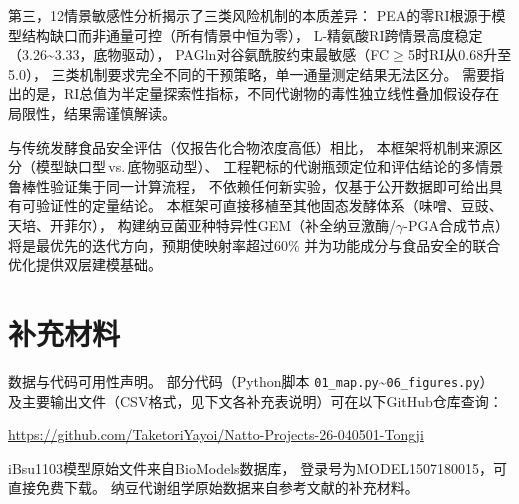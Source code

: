 \documentclass[10pt, a4paper, twocolumn]{ctexart}
\newcommand{\ibsu}{iBsu1103}
\begin{document}
第三，12情景敏感性分析揭示了三类风险机制的本质差异：
PEA的零RI根源于模型结构缺口而非通量可控（所有情景中恒为零），
L-精氨酸RI跨情景高度稳定（3.26\textasciitilde3.33，底物驱动），
PAGln对谷氨酰胺约束最敏感（FC$\geq$5时RI从0.68升至5.0），
三类机制要求完全不同的干预策略，单一通量测定结果无法区分。
需要指出的是，RI总值为半定量探索性指标，不同代谢物的毒性独立线性叠加假设存在局限性，结果需谨慎解读。

与传统发酵食品安全评估（仅报告化合物浓度高低）相比，
本框架将机制来源区分（模型缺口型\,vs.\,底物驱动型）、
工程靶标的代谢瓶颈定位和评估结论的多情景鲁棒性验证集于同一计算流程，
不依赖任何新实验，仅基于公开数据即可给出具有可验证性的定量结论。
本框架可直接移植至其他固态发酵体系（味噌、豆豉、天培、开菲尔），
构建纳豆菌亚种特异性GEM（补全纳豆激酶/\(\gamma\)-PGA合成节点）
将是最优先的迭代方向，预期使映射率超过60\%
并为功能成分与食品安全的联合优化提供双层建模基础。

\clearpage


\newpage
\onecolumn

\appendix
\renewcommand{\thesection}{附录\,\Alph{section}}
\renewcommand{\thetable}{S\arabic{table}}
\renewcommand{\thefigure}{S\arabic{figure}}
\setcounter{table}{0}
\setcounter{figure}{0}

\section*{\centering 补充材料}

\bigskip

数据与代码可用性声明。
部分代码（Python脚本 \texttt{01\_map.py}\textasciitilde\texttt{06\_figures.py}）
及主要输出文件（CSV格式，见下文各补充表说明）可在以下GitHub仓库查询：
\begin{center}
  \url{https://github.com/TaketoriYayoi/Natto-Projects-26-040501-Tongji}
\end{center}
\ibsu{}模型原始文件来自BioModels数据库，
登录号为MODEL1507180015，可直接免费下载。
纳豆代谢组学原始数据来自参考文献的补充材料。

\bigskip
\end{document}
